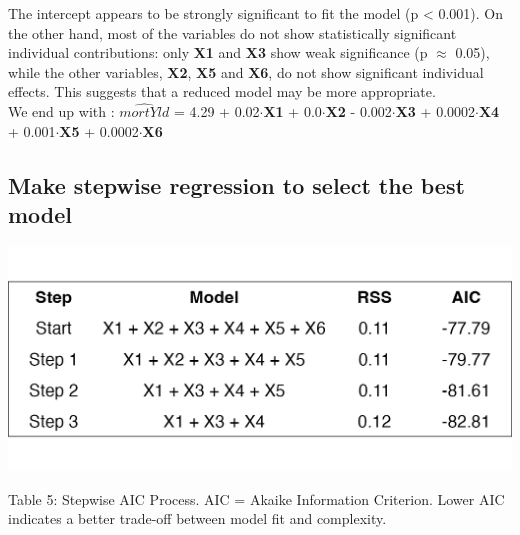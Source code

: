 \documentclass[
  12pt,
]{article}
\begin{document}
\addtocounter{table}{2}
\vspace{-5pt}

The intercept appears to be strongly significant to fit the model (p
\textless{} 0.001). On the other hand, most of the variables do not show
statistically significant individual contributions: only \textbf{X1} and
\textbf{X3} show weak significance (p \(\approx\) 0.05), while the other
variables, \textbf{X2}, \textbf{X5} and \textbf{X6}, do not show
significant individual effects. This suggests that a reduced model may
be more appropriate.\\
We end up with : \(\hat{mortYld}\) = 4.29 + 0.02\(\cdot\)\textbf{X1} +
0.0\(\cdot\)\textbf{X2} - 0.002\(\cdot\)\textbf{X3} +
0.0002\(\cdot\)\textbf{X4} + 0.001\(\cdot\)\textbf{X5} +
0.0002\(\cdot\)\textbf{X6}

\subsection{Make stepwise regression to select the best
model}\label{make-stepwise-regression-to-select-the-best-model}

\begin{minipage}{0.48\textwidth}
\centering
\includegraphics[width=\linewidth]{figures/stepwise_aic_table.png}
\vspace{-1.3em}
\parbox{\linewidth}{\fontsize{12}{14}\selectfont Table 5: Stepwise AIC Process. AIC = Akaike Information Criterion. Lower AIC indicates a better trade-off between model fit and complexity.}
\end{minipage}
\hfill
{}
\end{document}
